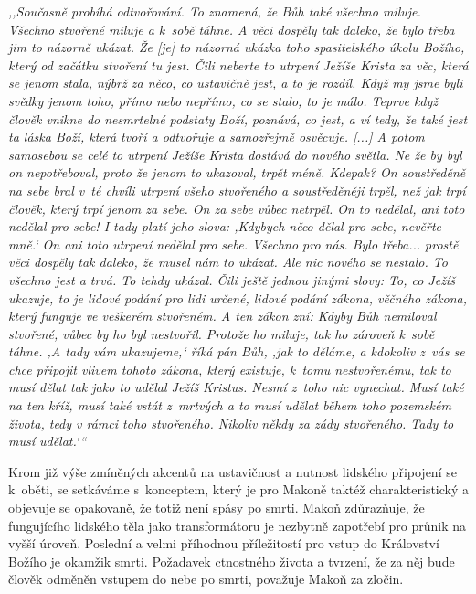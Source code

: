 \begin{enumerate}
{\textit{%
,,Současně probíhá odtvořování. To znamená, že Bůh také všechno miluje. Všechno
stvořené miluje a k~sobě táhne. A věci dospěly tak daleko, že bylo třeba jim to
názorně ukázat. Že [je] to názorná ukázka toho spasitelského úkolu Božího, který
od začátku stvoření tu jest. Čili neberte to utrpení Ježíše Krista za věc, která
se jenom stala, nýbrž za něco, co ustavičně jest, a to je rozdíl. Když my jsme
byli svědky jenom toho, přímo nebo nepřímo, co se stalo, to je málo. Teprve když
člověk vnikne do nesmrtelné podstaty Boží, poznává, co jest, a ví tedy, že také
jest ta láska Boží, která tvoří a odtvořuje a samozřejmě osvěcuje. [...] A potom
samosebou se celé to utrpení Ježíše Krista dostává do nového světla. Ne že by
byl on nepotřeboval, proto že jenom to ukazoval, trpět méně. Kdepak? On
soustředěně na sebe bral v~té chvíli utrpení všeho stvořeného a soustředěněji
trpěl, než jak trpí člověk, který trpí jenom za sebe. On za sebe vůbec netrpěl.
On to nedělal, ani toto nedělal pro sebe! I tady platí jeho slova: ,Kdybych něco
dělal pro sebe, nevěřte mně.` On ani toto utrpení nedělal pro sebe. Všechno pro
nás. Bylo třeba... prostě věci dospěly tak daleko, že musel nám to ukázat. Ale
nic nového se nestalo. To všechno jest a trvá. To tehdy ukázal. Čili ještě
jednou jinými slovy: To, co Ježíš ukazuje, to je lidové podání pro lidi určené,
lidové podání zákona, věčného zákona, který funguje ve veškerém stvořeném. A ten
zákon zní: Kdyby Bůh nemiloval stvořené, vůbec by ho byl nestvořil. Protože ho
miluje, tak ho zároveň k~sobě táhne. ,A tady vám ukazujeme,` říká pán Bůh, ,jak
to děláme, a kdokoliv z~vás se chce připojit vlivem tohoto zákona, který
existuje, k~tomu nestvořenému, tak to musí dělat tak jako to udělal Ježíš
Kristus. Nesmí z~toho nic vynechat. Musí také na ten kříž, musí také vstát
z~mrtvých a to musí udělat během toho pozemském života, tedy v rámci toho
stvořeného. Nikoliv někdy za zády stvořeného. Tady to musí udělat.`{}``
}

Krom již výše zmíněných akcentů na ustavičnost a nutnost lidského připojení se
        k~oběti, se setkáváme s~konceptem, který je pro Makoně taktéž
        charakteristický a objevuje se opakovaně, že totiž není spásy po smrti.
        Makoň zdůrazňuje, že fungujícího lidského těla jako transformátoru je
        nezbytně zapotřebí pro průnik na vyšší úroveň. Poslední a velmi
        příhodnou příležitostí pro vstup do Království Božího je okamžik smrti.
        Požadavek ctnostného života a tvrzení, že za něj bude člověk odměněn
        vstupem do nebe po smrti, považuje Makoň za zločin.

}
\end{enumerate}

